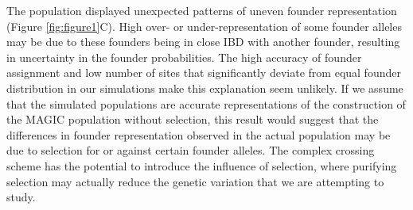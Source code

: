 \documentclass[article,9pt,twocolumn,twoside]{rilabRxiv}
\begin{document}

The population displayed unexpected patterns of uneven founder representation (Figure \ref{fig:figure1}C).
High over- or under-representation of some founder alleles may be due to these founders being in close IBD with another founder, resulting in uncertainty in the founder probabilities.
The high accuracy of founder assignment and low number of sites that significantly deviate from equal founder distribution in our simulations make this explanation seem unlikely.
%
If we assume that the simulated populations are accurate representations of the construction of the MAGIC population without selection, this result would suggest that the differences in founder representation observed in the actual population may be due to selection for or against certain founder alleles.
The complex crossing scheme has the potential to introduce the influence of selection, where purifying selection may actually reduce the genetic variation that we are attempting to study.
\end{document}
